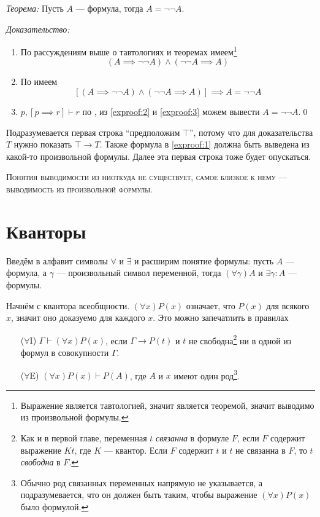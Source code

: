 {\it Теорема:} Пусть $A$ --- формула, тогда $A=\lnot\lnot A$.

	{\it Доказательство:}
\begin{enumerate}[label=(\arabic*)]
	\item{}По рассуждениям выше о тавтологиях и теоремах
	имеем\footnote{Выражение является тавтологией, значит является теоремой,
		значит выводимо из произвольной формулы.}
	\[
		(A\implies \lnot\lnot A)\land (\lnot\lnot A\implies A)
	\]
	\label{exproof:2}

	\item{}По \axiom{} имеем
	\label{exproof:3}
	\[
		[(A\implies \lnot\lnot A)\land (\lnot\lnot A\implies A)]\implies A=\lnot\lnot A
	\]
	\item{}${p,[p\implies r]\vdash r}$ по \taut{},
	из \ref{exproof:2} и \ref{exproof:3}
	можем вывести $A=\lnot\lnot A$.\qed
\end{enumerate}

Подразумевается первая строка ``предположим $\top$'', потому что для доказательства
$T$ нужно показать $\top\to T$. Также формула в \ref{exproof:1} должна быть выведена
из какой-то произвольной формулы. Далее эта первая строка тоже будет опускаться.

\textsc{Понятия выводимости из ниоткуда не существует,
	самое близкое к нему --- выводимость из произвольной формулы.}

\section{Кванторы}

\newcommand\Aii{$\forall$I}
\newcommand\Aee{$\forall$E}
\newcommand\Eii{$\exists$I}
\newcommand\Eee{$\exists$E}

Введём в алфавит символы $\forall$ и $\exists$ и расширим понятие формулы:
пусть $A$ --- формула, а $\gamma$ --- произвольный символ переменной,
тогда $(\forall\gamma)A$ и $\exists\gamma:A$ --- формулы.

Начнём с квантора всеобщности. $(\forall x)P(x)$ означает, что $P(x)$ для
всякого $x$, значит оно доказуемо для каждого $x$. Это можно запечатлить
в правилах
\begin{enumerate}
	\item[(\Aii{})]{}$\Gamma\vdash(\forall x)P(x)$, если $\Gamma\to P(t)$ и $t$
	не свободна\footnote{
		Как и в первой главе, переменная $t$ {\it связанна} в формуле $F$,
		если $F$ содержит
		выражение $Kt$, где $K$ --- квантор. Если $F$ содержит $t$ и $t$ не связанна
		в $F$, то $t$ {\it свободна} в $F$.
	} ни в одной из формул в совокупности $\Gamma$.

	\item[(\Aee{})]{}$(\forall x)P(x)\vdash P(A)$, где $A$ и $x$
	имеют один род\footnote{
		Обычно род связанных переменных напрямую не указывается, а подразумевается,
		что он должен быть таким, чтобы выражение $(\forall x)P(x)$ было формулой.
	}.
\end{enumerate}

